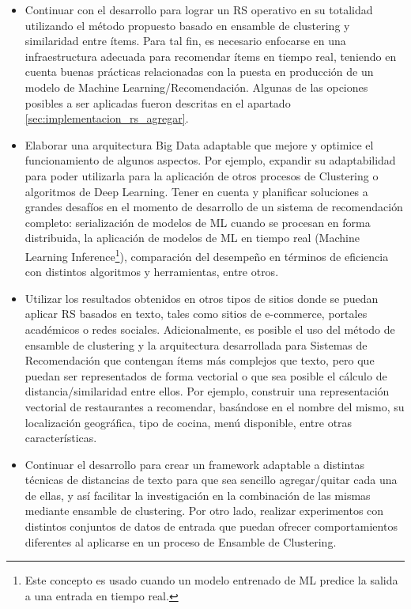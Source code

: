 \begin{itemize}
	\item Continuar con el desarrollo para lograr un RS operativo en su totalidad utilizando el método propuesto basado en ensamble de clustering y similaridad entre ítems. Para tal fin, es necesario enfocarse en una infraestructura adecuada para recomendar ítems en tiempo real, teniendo en cuenta buenas prácticas relacionadas con la puesta en producción de un modelo de Machine Learning/Recomendación. Algunas de las opciones posibles a ser aplicadas fueron descritas en el apartado \ref{sec:implementacion_rs_agregar}.
	\item Elaborar una arquitectura Big Data adaptable que mejore y optimice el funcionamiento de algunos aspectos. Por ejemplo, expandir su adaptabilidad para poder utilizarla para la aplicación de otros procesos de Clustering o algoritmos de Deep Learning. Tener en cuenta y planificar soluciones a grandes desafíos en el momento de desarrollo de un sistema de recomendación completo: serialización de modelos de ML cuando se procesan en forma distribuida, la aplicación de modelos de ML en tiempo real (Machine Learning Inference\footnote{Este concepto es usado cuando un modelo entrenado de ML predice la salida a una entrada en tiempo real.}), comparación del desempeño en términos de eficiencia con distintos algoritmos y herramientas, entre otros.
	\item Utilizar los resultados obtenidos en otros tipos de sitios donde se puedan aplicar RS basados en texto, tales como sitios de e-commerce, portales académicos o redes sociales. Adicionalmente, es posible el uso del método de ensamble de clustering y la arquitectura desarrollada para Sistemas de Recomendación que contengan ítems más complejos que texto, pero que puedan ser representados de forma vectorial o que sea posible el cálculo de distancia/similaridad entre ellos. Por ejemplo, construir una representación vectorial de restaurantes a recomendar, basándose en el nombre del mismo, su localización geográfica, tipo de cocina, menú disponible, entre otras características.
	\item Continuar el desarrollo para crear un framework adaptable a distintas técnicas de distancias de texto para que sea sencillo agregar/quitar cada una de ellas, y así facilitar la investigación en la combinación de las mismas mediante ensamble de clustering. Por otro lado, realizar experimentos con distintos conjuntos de datos de entrada que puedan ofrecer comportamientos diferentes al aplicarse en un proceso de Ensamble de Clustering.

\end{itemize}
